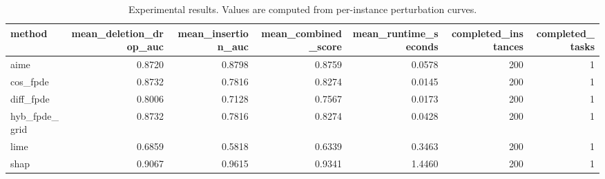 \begin{table}[t]
\caption{Experimental results. Values are computed from per-instance perturbation curves.}
\label{tab:main_results_computed}
\centering
\begin{tabular}{lrrrrrr}
\toprule
method & mean\_deletion\_drop\_auc & mean\_insertion\_auc & mean\_combined\_score & mean\_runtime\_seconds & completed\_instances & completed\_tasks \\
\midrule
aime & 0.8720 & 0.8798 & 0.8759 & 0.0578 & 200 & 1 \\
cos\_fpde & 0.8732 & 0.7816 & 0.8274 & 0.0145 & 200 & 1 \\
diff\_fpde & 0.8006 & 0.7128 & 0.7567 & 0.0173 & 200 & 1 \\
hyb\_fpde\_grid & 0.8732 & 0.7816 & 0.8274 & 0.0428 & 200 & 1 \\
lime & 0.6859 & 0.5818 & 0.6339 & 0.3463 & 200 & 1 \\
shap & 0.9067 & 0.9615 & 0.9341 & 1.4460 & 200 & 1 \\
\bottomrule
\end{tabular}

\end{table}
